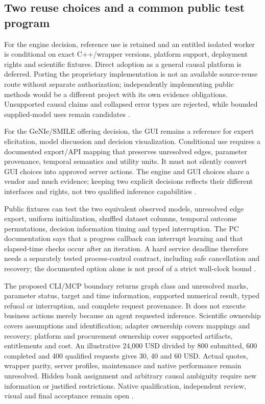 \subsection{Two reuse choices and a common public test program}
For the engine decision, reference use is retained and an entitled isolated
worker is conditional on exact C++/wrapper versions, platform support,
deployment rights and scientific fixtures. Direct adoption as a general
causal platform is deferred. Porting the proprietary implementation is not
an available source-reuse route without separate authorization; independently
implementing public methods would be a different project with its own
evidence obligations. Unsupported causal claims and collapsed error types
are rejected, while bounded supplied-model uses remain candidates
\cite{exec13_smile_intro,exec13_smile_license,exec24_smile_choice}.

For the GeNIe/SMILE offering decision, the GUI remains a reference for expert
elicitation, model discussion and decision visualization. Conditional use
requires a documented export/API mapping that preserves unresolved edges,
parameter provenance, temporal semantics and utility units. It must not
silently convert GUI choices into approved server actions. The engine and
GUI choices share a vendor and much evidence; keeping two explicit
decisions reflects their different interfaces and rights, not two qualified
inference capabilities \cite{exec24_smile_choice}.

Public fixtures can test the two equivalent observed models, unresolved
edge export, uniform initialization, shuffled dataset columns, temporal
outcome permutations, decision information timing and typed interruption.
The PC documentation says that a progress callback can interrupt learning
and that elapsed-time checks occur after an iteration. A hard service
deadline therefore needs a separately tested process-control contract,
including safe cancellation and recovery; the documented option alone is
not proof of a strict wall-clock bound
\cite{exec13_smile_pc,exec24_smile_choice}.

The proposed CLI/MCP boundary returns graph class and unresolved marks,
parameter status, target and time information, supported numerical result,
typed refusal or interruption, and complete request provenance. It does
not execute business actions merely because an agent requested inference.
Scientific ownership covers assumptions and identification; adapter
ownership covers mappings and recovery; platform and procurement ownership
cover supported artifacts, entitlements and cost. An illustrative
24,000 USD divided by 800 submitted, 600 completed and 400 qualified
requests gives 30, 40 and 60 USD. Actual quotes, wrapper parity, server
profiles, maintenance and native performance remain unresolved. Hidden
bank assignment and arbitrary causal ambiguity require new information or
justified restrictions. Native qualification, independent review, visual
and final acceptance remain open \cite{exec24_smile_choice}.
